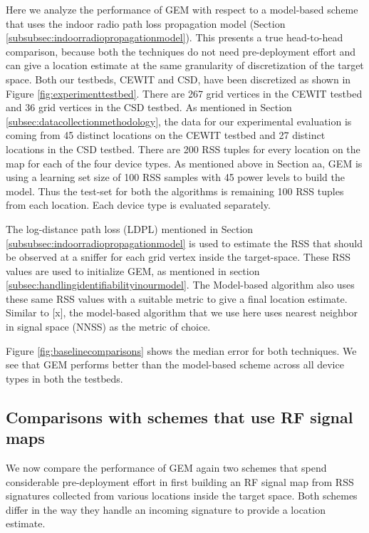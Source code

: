 \documentclass{Localization-PaperWriteupDraft}
\begin{document}
Here we analyze the performance of GEM with respect to a model-based scheme that uses the indoor radio path loss propagation model (Section \ref{subsubsec:indoorradiopropagationmodel}). This presents a true head-to-head comparison, because both the techniques do not need pre-deployment effort and can  give a location estimate at the same granularity of discretization of the target space. Both our testbeds, CEWIT and CSD, have been discretized as shown in Figure \ref{fig:experimenttestbed}. There are 267 grid vertices in the CEWIT testbed and 36 grid vertices in the CSD testbed. As mentioned in Section \ref{subsec:datacollectionmethodology}, the data for our experimental evaluation is coming from 45 distinct locations on the CEWIT testbed and 27 distinct locations in the CSD testbed. There are 200 RSS tuples for every location on the map for each of the four device types. As mentioned above in Section aa, GEM is using a learning set size of 100 RSS samples with 45 power levels to build the model. Thus the test-set for both the algorithms is remaining 100 RSS tuples from each location. Each device type is evaluated separately.

The log-distance path loss (LDPL) mentioned in Section \ref{subsubsec:indoorradiopropagationmodel} is used to estimate the RSS that should be observed at a sniffer for each grid vertex inside the target-space. These RSS values are used to initialize GEM, as mentioned in section \ref{subsec:handlingidentifiabilityinourmodel}. The Model-based algorithm also uses these same RSS values with a suitable metric to give a final location estimate. Similar to [x], the model-based algorithm that we use here uses nearest neighbor in signal space (NNSS) as the metric of choice. 

Figure \ref{fig:baselinecomparisons} shows the median error for both techniques. We see that GEM performs better than the model-based scheme across all device types in both the testbeds.

\subsection{Comparisons with schemes that use RF signal maps}
\label{subsec:comparisonswithschemesthatuserfsignalmaps}

We now compare the performance of GEM again two schemes that spend considerable pre-deployment effort in first building an RF signal map from RSS signatures collected from various locations inside the target space. Both schemes differ in the way they handle an incoming signature to provide a location estimate.
\end{document}
